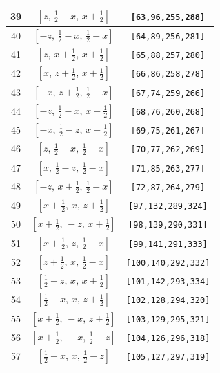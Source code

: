 \documentclass[fleqn,8pt]{jsarticle}
\begin{document}
\begin{longtable}{ccc}
39 & $\left[ z,\, \frac{1}{2} - x,\, x + \frac{1}{2} \right]$ & {\tt [63,96,255,288]} \\ \hline
40 & $\left[ - z,\, \frac{1}{2} - x,\, \frac{1}{2} - x \right]$ & {\tt [64,89,256,281]} \\ \hline
41 & $\left[ z,\, x + \frac{1}{2},\, x + \frac{1}{2} \right]$ & {\tt [65,88,257,280]} \\ \hline
42 & $\left[ x,\, z + \frac{1}{2},\, x + \frac{1}{2} \right]$ & {\tt [66,86,258,278]} \\ \hline
43 & $\left[ - x,\, z + \frac{1}{2},\, \frac{1}{2} - x \right]$ & {\tt [67,74,259,266]} \\ \hline
44 & $\left[ - z,\, \frac{1}{2} - x,\, x + \frac{1}{2} \right]$ & {\tt [68,76,260,268]} \\ \hline
45 & $\left[ - x,\, \frac{1}{2} - z,\, x + \frac{1}{2} \right]$ & {\tt [69,75,261,267]} \\ \hline
46 & $\left[ z,\, \frac{1}{2} - x,\, \frac{1}{2} - x \right]$ & {\tt [70,77,262,269]} \\ \hline
47 & $\left[ x,\, \frac{1}{2} - z,\, \frac{1}{2} - x \right]$ & {\tt [71,85,263,277]} \\ \hline
48 & $\left[ - z,\, x + \frac{1}{2},\, \frac{1}{2} - x \right]$ & {\tt [72,87,264,279]} \\ \hline
49 & $\left[ x + \frac{1}{2},\, x,\, z + \frac{1}{2} \right]$ & {\tt [97,132,289,324]} \\ \hline
50 & $\left[ x + \frac{1}{2},\, - z,\, x + \frac{1}{2} \right]$ & {\tt [98,139,290,331]} \\ \hline
51 & $\left[ x + \frac{1}{2},\, z,\, \frac{1}{2} - x \right]$ & {\tt [99,141,291,333]} \\ \hline
52 & $\left[ z + \frac{1}{2},\, x,\, \frac{1}{2} - x \right]$ & {\tt [100,140,292,332]} \\ \hline
53 & $\left[ \frac{1}{2} - z,\, x,\, x + \frac{1}{2} \right]$ & {\tt [101,142,293,334]} \\ \hline
54 & $\left[ \frac{1}{2} - x,\, x,\, z + \frac{1}{2} \right]$ & {\tt [102,128,294,320]} \\ \hline
55 & $\left[ x + \frac{1}{2},\, - x,\, z + \frac{1}{2} \right]$ & {\tt [103,129,295,321]} \\ \hline
56 & $\left[ x + \frac{1}{2},\, - x,\, \frac{1}{2} - z \right]$ & {\tt [104,126,296,318]} \\ \hline
57 & $\left[ \frac{1}{2} - x,\, x,\, \frac{1}{2} - z \right]$ & {\tt [105,127,297,319]} \\ \hline

\end{longtable}
\end{document}
